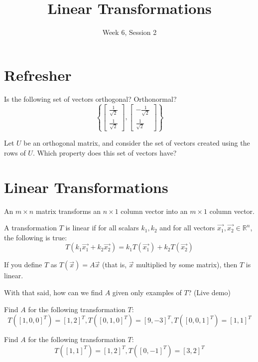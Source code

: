 \documentclass[11pt]{exam}
\title{Linear Transformations}
\date{Week 6, Session 2}
\begin{document}
\maketitle

\section{Refresher}
\vspace{20px}
\begin{questions}
    \item Is the following set of vectors orthogonal? Orthonormal?
    $$ \left \{
        \begin{bmatrix} \frac{1}{\sqrt{2}} \\ \frac{1}{\sqrt{2}} \end{bmatrix},
        \begin{bmatrix} -\frac{1}{\sqrt{2}} \\ \frac{1}{\sqrt{2}} \end{bmatrix}
    \right \} $$
    \item Let $U$ be an orthogonal matrix, and consider the set of vectors created using the rows of $U$. Which property does this set of vectors have?
\end{questions}

\vspace{20px}
\section{Linear Transformations}
    
    An $m \times n$ matrix transforms an $n \times 1$ column vector into an $m \times 1$ column vector.

    A transformation $T$ is linear if for all scalars $k_1, k_2$ and for all vectors $\vec{x_1}, \vec{x_2} \in \mathbb{R}^n$, the following is true:
    $$ T(k_1 \vec{x_1} + k_2 \vec{x_2}) = k_1 T(\vec{x_1}) + k_2 T(\vec{x_2})$$

    If you define $T$ as $T(\vec{x}) = A \vec{x}$ (that is, $\vec{x}$ multiplied by some matrix), then $T$ is linear.

    \vspace{20px}
    With that said, how can we find $A$ given only examples of $T$? (Live demo)

    \begin{questions}
        \item Find $A$ for the following transformation $T$:
        $$T([1,0,0]^T) = [1,2]^T, T([0,1,0]^T) = [9,-3]^T, T([0,0,1]^T) = [1,1]^T$$
        \item Find $A$ for the following transformation $T$:
        $$T([1,1]^T) = [1,2]^T, T([0,-1]^T) = [3,2]^T$$
    \end{questions}
\end{document}
